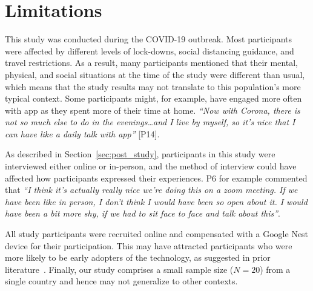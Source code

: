 \section{Limitations}

    This study was conducted during the COVID-19 outbreak. Most participants were affected by different levels of lock-downs, social distancing guidance, and travel restrictions. As a result, many participants mentioned that their mental, physical, and social situations at the time of the study were different than usual, which means that the study results may not translate to this population's more typical context. Some participants might, for example, have engaged more often with \acl{app} as they spent more of their time at home. \textit{``Now with Corona, there is not so much else to do in the evenings\ldots and I live by myself, so it's nice that I can have like a daily talk with \acl{app}''} [P14].

    As described in Section~\ref{sec:post_study}, participants in this study were interviewed either online or in-person, and the method of interview could have affected how participants expressed their experiences. P6 for example commented that \textit{``I think it's actually really nice we're doing this on a zoom meeting. If we have been like in person, I don't think I would have been so open about it. I would have been a bit more shy, if we had to sit face to face and talk about this''}.
    
    All study participants were recruited online and compensated with a Google Nest device for their participation. This may have attracted participants who were more likely to be early adopters of the technology, as suggested in prior literature~\cite{lau2018alexa}. Finally, our study comprises a small sample size ($N=20$) from a single country and hence may not generalize to other contexts.
    

